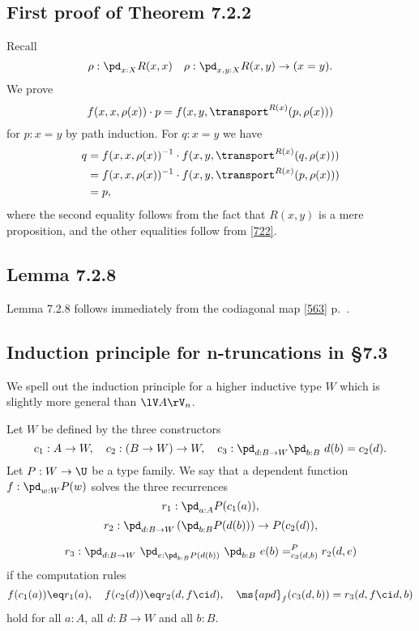 \documentclass[12pt]{article}
\begin{document}

\subsection{First proof of Theorem 7.2.2}

Recall 
$$
\rho:\pd_{x:X}R(x,x)\quad\rho:\pd_{x,y:X}R(x,y)\to(x=y).
$$ 
We prove 
\begin{equation}\label{722}
f(x,x,\rho(x))\cdot p=f(x,y,\transport^{R(x)}(p,\rho(x)))
\end{equation}  
for $p:x=y$ by path induction. For $q:x=y$ we have 
\begin{align*}
q&=f(x,x,\rho(x))^{-1}\cdot f(x,y,\transport^{R(x)}(q,\rho(x)))\\
&=f(x,x,\rho(x))^{-1}\cdot f(x,y,\transport^{R(x)}(p,\rho(x)))\\
&=p,
\end{align*} 
where the second equality follows from the fact that $R(x,y)$ is a mere proposition, and the other equalities follow from \eqref{722}.


\subsection{Lemma 7.2.8}

Lemma 7.2.8 follows immediately from the codiagonal map \eqref{563} p.~\pageref{563}.

\subsection{Induction principle for n-truncations in \S7.3}

We spell out the induction principle for a higher inductive type $W$ which is slightly more general than $\lV A\rV_n$.

Let $W$ be defined by the three constructors 
$$
c_1:A\to W,\quad c_2:(B\to W)\to W,\quad c_3:\pd_{d:B\to W}\pd_{b:B}\ d(b)=c_2(d).
$$ 
Let $P:W\to\U$ be a type family. We say that a dependent function $f:\pd_{w:W}P(w)$ solves the three recurrences 
$$
r_1:\pd_{a:A}P(c_1(a)),
$$ 
$$
r_2:\pd_{d:B\to W}\left(\pd_{b:B}P(d(b))\right)\to P(c_2(d)),
$$

$$
r_3:\pd_{d:B\to W}\ \pd_{e:\pd_{b:B}P(d(b))}\ \pd_{b:B}\ e(b)=^P_{c_3(d,b)}r_2(d,e)
$$ 
if the computation rules
$$
f(c_1(a))\eq r_1(a),\quad f(c_2(d))\eq r_2(d,f\ci d),\quad\ms{apd}_f(c_3(d,b))=r_3(d,f\ci d,b)
$$ 
hold for all $a:A$, all $d:B\to W$ and all $b:B$. 
\end{document}
